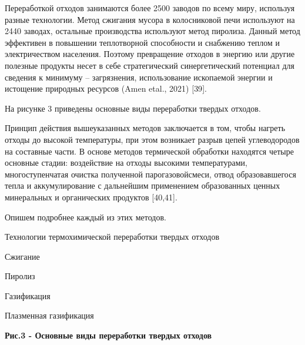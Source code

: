 \begin{multicols}{2}
Переработкой отходов занимаются более 2500 заводов по всему миру,
используя разные технологии. Метод сжигания мусора в колосниковой печи
используют на 2440 заводах, остальные производства используют метод
пиролиза. Данный метод эффективен в повышении теплотворной способности и
снабжению теплом и электричеством населения. Поэтому превращение отходов
в энергию или другие полезные продукты несет в себе стратегический
синергетический потенциал для сведения к минимуму -- загрязнения,
использование ископаемой энергии и истощение природных ресурсов (Amen
etal., 2021) {[}39{]}.

На рисунке 3 приведены основные виды переработки твердых отходов.

Принцип действия вышеуказанных методов заключается в том, чтобы нагреть
отходы до высокой тем­пературы, при этом возникает разрыв цепей
углеводо­родов на составные части. В основе методов термической обработки
находятся четыре основные стадии: воздей­ствие на отходы высокими
температура­ми, многоступенчатая очистка полученной парогазовойсмеси,
отвод образовавшегося тепла и аккумулирование с дальнейшим применением
образованных ценных мине­ральных и органических продуктов {[}40,41{]}.

Опишем подробнее каждый из этих методов.

Технологии термохимической переработки твердых отходов

Сжигание

Пиролиз

Газификация

Плазменная газификация
\end{multicols}

{\bfseries Рис.3 - Основные виды переработки твердых отходов}

